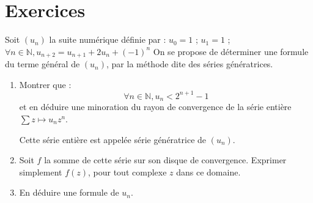 \section{Exercices}

\begin{exer}
Soit $(u_n)$ la suite numérique définie par :
$u_0 = 1$ ; $u_1 = 1$ ; $\forall n \in \mathbb{N} , u_{n+2} = u_{n+1} + 2u_n +(-1)^n$
On se propose de déterminer une formule du terme général de $(u_n)$, par la méthode dite des séries génératrices.
\begin{enumerate}
\item Montrer que : \[\forall n \in \mathbb{N} , u_n < 2^{n+1} - 1\]
et en déduire une minoration du rayon de convergence de la série entière $\sum z \mapsto u_n z^n$.

Cette série entière est appelée série génératrice de $(u_n)$.
\item Soit $f$ la somme de cette série sur son disque de convergence. %
Exprimer simplement $f(z)$, pour tout complexe $z$ dans ce domaine.
\item En déduire une formule de $u_n$.
\end{enumerate}
\end{exer}

